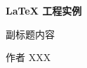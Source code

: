 \begin{titlepage}
    \centering

    \vspace*{5cm} %
    {\Huge \bfseries LaTeX 工程实例\par}  %
    \vspace{1em}

    {\LARGE 副标题内容\par}  %
    \vfill %
    {\large 作者 XXX\par}  %
\end{titlepage}